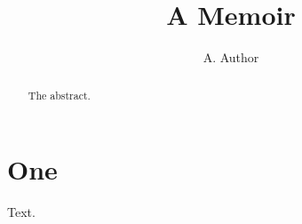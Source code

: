 \documentclass{memomini}
\begin{document}
\title{A Memoir}
\author{A. Author}
\maketitle
\begin{abstract}
The abstract.
\end{abstract}
\tableofcontents
\chapter{One}
Text.
\end{document}
